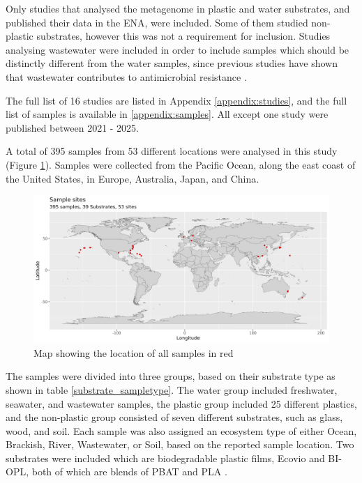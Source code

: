 Only studies that analysed the metagenome in plastic and water substrates, and published their data in the ENA, were included. Some of them studied non-plastic substrates, however this was not a requirement for inclusion. Studies analysing wastewater were included in order to include samples which should be distinctly different from the water samples, since previous studies have shown that wastewater contributes to antimicrobial resistance \cite{sambaza2023ContributionWastewaterAntimicrobial}.

The full list of 16 studies are listed in Appendix \ref{appendix:studies}, and the full list of samples is available in \ref{appendix:samples}. All except one study were published between 2021 - 2025.

A total of 395 samples from 53 different locations were analysed in this study (Figure \ref{world_map}). 
Samples were collected from the Pacific Ocean, along the east coast of the United States, in Europe, Australia, Japan, and China.


\begin{figure}[h]
    \centering
    \includegraphics[width = \textwidth]{figure/map.png}
    \caption{Map showing the location of all samples in red}
    \label{world_map}
\end{figure}

The samples were divided into three groups, based on their substrate type as shown in table \ref{substrate_sampletype}. 
The water group included freshwater, seawater, and wastewater samples, the plastic group included 25 different plastics, and the non-plastic group consisted of seven different substrates, such as glass, wood, and soil. 
Each sample was also assigned an ecosystem type of either Ocean, Brackish, River, Wastewater, or Soil, based on the reported sample location.
Two substrates were included which are biodegradable plastic films, Ecovio and BI-OPL, both of which are blends of PBAT and PLA \cite{ruthi2023PlastisphereMicrobiomeAlpine}.


